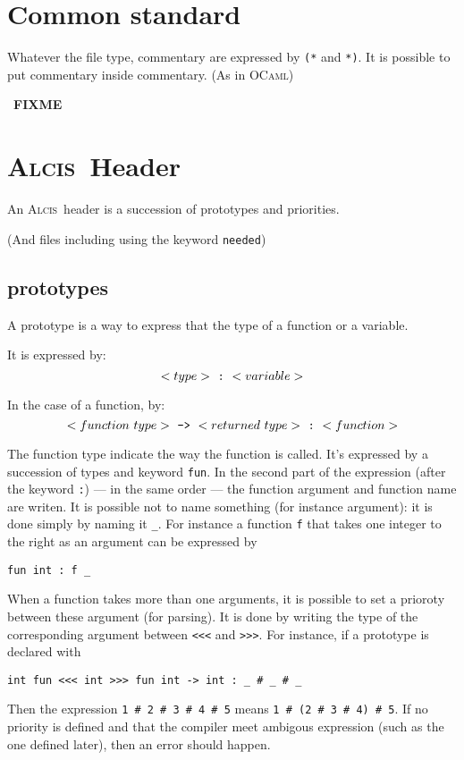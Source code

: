 \documentclass{article}
\newcommand{\Alcis}{\textsc{Alcis}~}
\newcommand{\FIXME}{~\textbf{FIXME}~}
\begin{document}
\section{Common standard}

Whatever the file type, commentary are expressed by \lstinline$(*$ and \lstinline$*)$.
It is possible to put commentary inside commentary. (As in \textsc{OCaml})

\FIXME

\section{\Alcis Header}

An \Alcis header is a succession of prototypes and priorities.

(And files including using the keyword \texttt{needed})

\subsection{prototypes}

A prototype is a way to express that the type of a function or a variable.

It is expressed by:
\[
    <type>~\textrm{\tt:}~<variable>
\]

In the case of a function, by:
\[
    <function~type>~\textrm{\tt->}~<returned~type>~\textrm{\tt:}~<function>
\]

The function type indicate the way the function is called.
It’s expressed by a succession of types and keyword \lstinline$fun$.
In the second part of the expression (after the keyword \lstinline$:$) — in the same order — the function argument and function name are writen.
It is possible not to name something (for instance argument): it is done simply by naming it \texttt{\_}.
For instance a function \lstinline$f$ that takes one integer to the right as an argument can be expressed by
\begin{lstlisting}
fun int : f _
\end{lstlisting}

When a function takes more than one arguments, it is possible to set a prioroty between these argument (for parsing).
It is done by writing the type of the corresponding argument between \lstinline$<<<$ and \lstinline$>>>$.
For instance, if a prototype is declared with
\begin{lstlisting}
int fun <<< int >>> fun int -> int : _ # _ # _
\end{lstlisting}
Then the expression \lstinline$1 # 2 # 3 # 4 # 5$ means \lstinline$1 # (2 # 3 # 4) # 5$.
If no priority is defined and that the compiler meet ambigous expression (such as the one defined later), then an error should happen.
\end{document}
